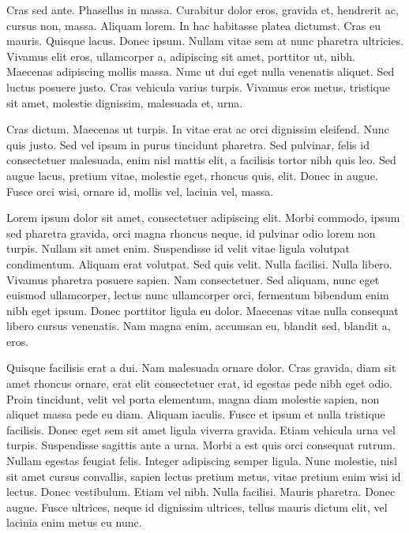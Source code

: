 Cras sed ante. Phasellus in massa. Curabitur dolor eros, gravida et, hendrerit ac, cursus non, massa. Aliquam lorem. In hac habitasse platea dictumst. Cras eu mauris. Quisque lacus. Donec ipsum. Nullam vitae sem at nunc pharetra ultricies. Vivamus elit eros, ullamcorper a, adipiscing sit amet, porttitor ut, nibh. Maecenas adipiscing mollis massa. Nunc ut dui eget nulla venenatis aliquet. Sed luctus posuere justo. Cras vehicula varius turpis. Vivamus eros metus, tristique sit amet, molestie dignissim, malesuada et, urna.

Cras dictum. Maecenas ut turpis. In vitae erat ac orci dignissim eleifend. Nunc quis justo. Sed vel ipsum in purus tincidunt pharetra. Sed pulvinar, felis id consectetuer malesuada, enim nisl mattis elit, a facilisis tortor nibh quis leo. Sed augue lacus, pretium vitae, molestie eget, rhoncus quis, elit. Donec in augue. Fusce orci wisi, ornare id, mollis vel, lacinia vel, massa.

Lorem ipsum dolor sit amet, consectetuer adipiscing elit. Morbi commodo, ipsum sed pharetra gravida, orci magna rhoncus neque, id pulvinar odio lorem non turpis. Nullam sit amet enim. Suspendisse id velit vitae ligula volutpat condimentum. Aliquam erat volutpat. Sed quis velit. Nulla facilisi. Nulla libero. Vivamus pharetra posuere sapien. Nam consectetuer. Sed aliquam, nunc eget euismod ullamcorper, lectus nunc ullamcorper orci, fermentum bibendum enim nibh eget ipsum. Donec porttitor ligula eu dolor. Maecenas vitae nulla consequat libero cursus venenatis. Nam magna enim, accumsan eu, blandit sed, blandit a, eros.

Quisque facilisis erat a dui. Nam malesuada ornare dolor. Cras gravida, diam sit amet rhoncus ornare, erat elit consectetuer erat, id egestas pede nibh eget odio. Proin tincidunt, velit vel porta elementum, magna diam molestie sapien, non aliquet massa pede eu diam. Aliquam iaculis. Fusce et ipsum et nulla tristique facilisis. Donec eget sem sit amet ligula viverra gravida. Etiam vehicula urna vel turpis. Suspendisse sagittis ante a urna. Morbi a est quis orci consequat rutrum. Nullam egestas feugiat felis. Integer adipiscing semper ligula. Nunc molestie, nisl sit amet cursus convallis, sapien lectus pretium metus, vitae pretium enim wisi id lectus. Donec vestibulum. Etiam vel nibh. Nulla facilisi. Mauris pharetra. Donec augue. Fusce ultrices, neque id dignissim ultrices, tellus mauris dictum elit, vel lacinia enim metus eu nunc.

